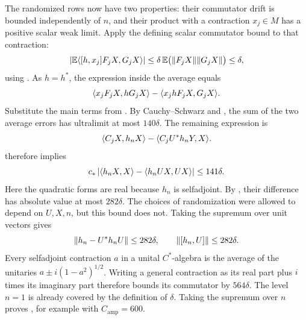The randomized rows now have two properties: their commutator drift
is bounded independently of \(n\), and their product with a
contraction \(x_j\in M\) has a positive scalar weak limit.
Apply the defining scalar commutator bound to that contraction:
\[
 \left|\mathbb E\langle [h,x_j]F_jX,G_jX\rangle\right|
 \le\delta\,\mathbb E\bigl(\lVert F_jX\rVert\lVert G_jX\rVert\bigr)\le\delta,
\]
using .
As \(h=h^*\), the expression inside the average equals
\[
 \langle x_jF_jX,hG_jX\rangle-\langle x_jhF_jX,G_jX\rangle.
\]
Substitute the main terms from
.
By Cauchy--Schwarz and , the sum of the two
average errors has ultralimit at most \(140\delta\).
The remaining expression is
\[
 \langle C_jX,h_nX\rangle-\langle C_jU^*h_nY,X\rangle.
\]
 therefore implies
\[
 c_*\left|\langle h_nX,X\rangle-\langle h_nUX,UX\rangle\right|
 \le141\delta.
\]
Here the quadratic forms are real because \(h_n\) is selfadjoint.
By , their difference has absolute value
at most \(282\delta\). The choices of randomization were allowed
to depend on \(U,X,n\), but this bound does not.
Taking the supremum over unit vectors gives
\[
 \lVert h_n-U^*h_nU\rVert\le282\delta,\qquad
 \lVert[h_n,U]\rVert\le282\delta.
\]
Every selfadjoint contraction \(a\) in a unital \(C^*\)-algebra is
the average of the unitaries
\(a\pm i(1-a^2)^{1/2}\).
Writing a general contraction as its real part plus \(i\) times
its imaginary part therefore bounds its commutator by
\(564\delta\).
The level \(n=1\) is already covered by the definition of \(\delta\).
Taking the supremum over \(n\) proves
, for example with
\(C_{\mathrm{amp}}=600\).
